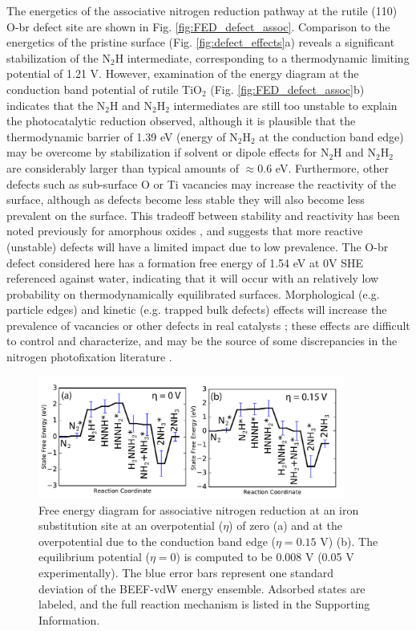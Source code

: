 \documentclass[journal=ascecg,manuscript=article,articletitle=true]{achemso}
\begin{document}
The energetics of the associative nitrogen reduction pathway at the rutile (110) O-br defect site are shown in Fig. \ref{fig:FED_defect_assoc}. Comparison to the energetics of the pristine surface (Fig. \ref{fig:defect_effects}a) reveals a significant stabilization of the N$_2$H intermediate, corresponding to a thermodynamic limiting potential of 1.21 V. However, examination of the energy diagram at the conduction band potential of rutile TiO$_2$ (Fig. \ref{fig:FED_defect_assoc}b) indicates that the N$_2$H and N$_2$H$_2$ intermediates are still too unstable to explain the photocatalytic reduction observed, although it is plausible that the thermodynamic barrier of 1.39 eV (energy of N$_2$H$_2$ at the conduction band edge) may be overcome by stabilization if solvent or dipole effects for N$_2$H and N$_2$H$_2$ are considerably larger than typical amounts  of $\approx$0.6 eV\cite{Karlberg_2007,He_2017,Hellman2017}. Furthermore, other defects such as sub-surface O or Ti vacancies may increase the reactivity of the surface, although as defects become less stable they will also become less prevalent on the surface. This tradeoff between stability and reactivity has been noted previously for amorphous oxides \cite{Goldsmith_2013}, and suggests that more reactive (unstable) defects will have a limited impact due to low prevalence. The O-br defect considered here has a formation free energy of 1.54 eV at 0V SHE referenced against water, indicating that it will occur with an relatively low probability on thermodynamically equilibrated surfaces. Morphological (e.g. particle edges) and kinetic (e.g. trapped bulk defects) effects will increase the prevalence of vacancies or other defects in real catalysts \cite{Yan_2013}; these effects are difficult to control and characterize, and may be the source of some discrepancies in the nitrogen photofixation literature \cite{Medford_2017}.


\begin{figure}
\includegraphics[width=0.9\textwidth]{figures/Fe_defect_associative_FED.pdf}
\caption{Free energy diagram for associative nitrogen reduction at an iron substitution site at an overpotential ($\eta$) of zero (a) and at the overpotential due to the conduction band edge ($\eta=0.15$ V) (b). The equilibrium potential ($\eta=0$) is computed to be 0.008 V (0.05 V experimentally). The blue error bars represent one standard deviation of the BEEF-vdW energy ensemble. Adsorbed states are labeled, and the full reaction mechanism is listed in the Supporting Information.}
\label{fig:FED_FE_assoc}
\end{figure}
\end{document}
